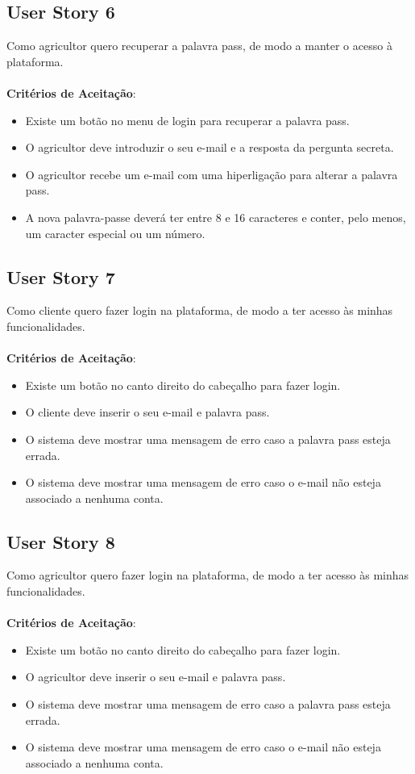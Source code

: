 \documentclass[a4paper,11pt]{article}
\begin{document}
\subsection{User Story 6}
Como agricultor quero recuperar a palavra pass, de modo a manter o acesso à plataforma.\\\\
\textbf{Critérios de Aceitação}:
\begin{itemize}
  \item Existe um botão no menu de login para recuperar a palavra pass.
  \item O agricultor deve introduzir o seu e-mail e a resposta da pergunta secreta.
  \item O agricultor recebe um e-mail com uma hiperligação para alterar a palavra pass.
  \item A nova palavra-passe deverá ter entre 8 e 16 caracteres e conter, pelo menos, um caracter especial ou um número.
\end{itemize}
\subsection{User Story 7}
Como cliente quero fazer login na plataforma, de modo a ter acesso às minhas funcionalidades.\\\\
\textbf{Critérios de Aceitação}:
\begin{itemize}
  \item Existe um botão no canto direito do cabeçalho para fazer login.
  \item O cliente deve inserir o seu e-mail e palavra pass.
  \item O sistema deve mostrar uma mensagem de erro caso a palavra pass esteja errada.
  \item O sistema deve mostrar uma mensagem de erro caso o e-mail não esteja associado a nenhuma conta.
\end{itemize}
\subsection{User Story 8}
Como agricultor quero fazer login na plataforma, de modo a ter acesso às minhas funcionalidades.\\\\
\textbf{Critérios de Aceitação}:
\begin{itemize}
  \item Existe um botão no canto direito do cabeçalho para fazer login.
  \item O agricultor deve inserir o seu e-mail e palavra pass.
  \item O sistema deve mostrar uma mensagem de erro caso a palavra pass esteja errada.
  \item O sistema deve mostrar uma mensagem de erro caso o e-mail não esteja associado a nenhuma conta.
\end{itemize}
\end{document}
